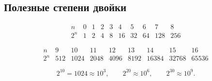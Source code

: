 \documentclass[../final.tex]{subfiles}
\begin{document}

\subsection{Полезные степени двойки}

\[
\begin{array}{c|ccccccccc}
n
&0&1&2&3&4&5&6&7&8
\\
2^n
&1&2&4&8&16&32&64&128&256
\end{array}
\]

\[
\begin{array}{c|cccccccc}
n
&9&10&11&12&13&14&15&16
\\
2^n
&512&1024&2048&4096&8192&16384&32768&65536
\end{array}
\]

\[
2^{10}=1024\approx10^3,
\qquad
2^{20}\approx10^6,
\qquad
2^{30}\approx10^9.
\]
\end{document}
